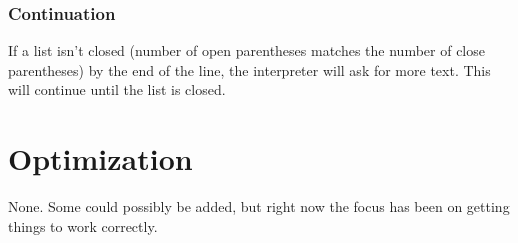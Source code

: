 \documentclass[10pt, openany]{book}
\begin{document}
\subsubsection{Continuation}
If a list isn't closed (number of open parentheses matches the number of close parentheses) by the end of the line, the interpreter will ask for more text.  This will continue until the list is closed.

\section{Optimization}
None.  Some could possibly be added, but right now the focus has been on getting things to work correctly.

\end{document}
